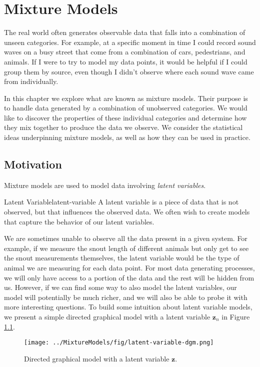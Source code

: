 \chapter{Mixture Models}
The real world often generates observable data that falls into a combination of unseen categories. For example, at a specific moment in time I could record sound waves on a busy street that come from a combination of cars, pedestrians, and animals. If I were to try to model my data points, it would be helpful if I could group them by source, even though I didn't observe where each sound wave came from individually.

In this chapter we explore what are known as mixture models. Their purpose is to handle data generated by a combination of unobserved categories. We would like to discover the properties of these individual categories and determine how they mix together to produce the data we observe. We consider the statistical ideas underpinning mixture models, as well as how they can be used in practice.

\section{Motivation}
Mixture models are used to model data involving \textit{latent variables}.

\begin{definition}{Latent Variable}{latent-variable}
    A latent variable is a piece of data that is not observed, but that influences the observed data. We often wish to create models that capture the behavior of our latent variables.
\end{definition}

We are sometimes unable to observe all the data present in a given system. For example, if we measure the snout length of different animals but only get to see the snout measurements themselves, the latent variable would be the type of animal we are measuring for each data point. For most data generating processes, we will only have access to a portion of the data and the rest will be hidden from us. However, if we can find some way to also model the latent variables, our model will potentially be much richer, and we will also be able to probe it with more interesting questions. To build some intuition about latent variable models, we present a simple directed graphical model with a latent variable $\textbf{z}_n$ in Figure \ref{fig:lvm-dgm}.

\begin{figure}
    \centering
    \texttt{[image: ../MixtureModels/fig/latent-variable-dgm.png]}
    \caption{Directed graphical model with a latent variable $\textbf{z}$.}
    \label{fig:lvm-dgm}
\end{figure}

